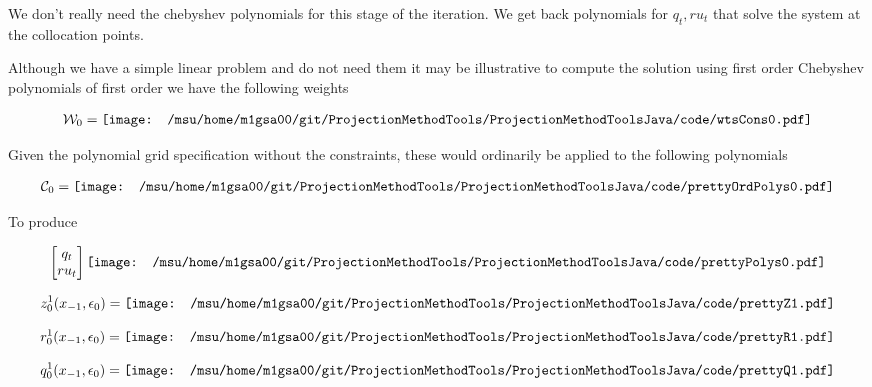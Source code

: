\documentclass[12pt]{article}
\begin{document}
We don't really need the chebyshev polynomials for this stage of the iteration.
We get back polynomials for $q_t, ru_t$ that solve the system at the collocation points.

Although we have a simple linear problem and do not need them it may be illustrative to 
compute the solution using first order Chebyshev polynomials of first order we have the following weights

 \begin{gather*}
\mathcal{W}_0=   \vcenter{\hbox{\texttt{[image: /msu/home/m1gsa00/git/ProjectionMethodTools/ProjectionMethodToolsJava/code/wtsCons0.pdf]}}}
 \end{gather*}


Given the polynomial grid specification without the constraints, these would ordinarily be applied to the following polynomials


 \begin{gather*}
\mathcal{C}_0=   \vcenter{\hbox{\texttt{[image: /msu/home/m1gsa00/git/ProjectionMethodTools/ProjectionMethodToolsJava/code/prettyOrdPolys0.pdf]}}}
 \end{gather*}

To produce

 \begin{gather*}
   \begin{bmatrix}
     q_t\\ru_t
   \end{bmatrix}
\vcenter{\hbox{\texttt{[image: /msu/home/m1gsa00/git/ProjectionMethodTools/ProjectionMethodToolsJava/code/prettyPolys0.pdf]}}}
 \end{gather*}


 \begin{gather*}
z_0^1(x_{-1},\epsilon_0)=   \vcenter{\hbox{\texttt{[image: /msu/home/m1gsa00/git/ProjectionMethodTools/ProjectionMethodToolsJava/code/prettyZ1.pdf]}}}
 \end{gather*}


 \begin{gather*}
r_0^1(x_{-1},\epsilon_0)=   \vcenter{\hbox{\texttt{[image: /msu/home/m1gsa00/git/ProjectionMethodTools/ProjectionMethodToolsJava/code/prettyR1.pdf]}}}
 \end{gather*}

 \begin{gather*}
q_0^1(x_{-1},\epsilon_0)=   \vcenter{\hbox{\texttt{[image: /msu/home/m1gsa00/git/ProjectionMethodTools/ProjectionMethodToolsJava/code/prettyQ1.pdf]}}}
 \end{gather*}
\end{document}
